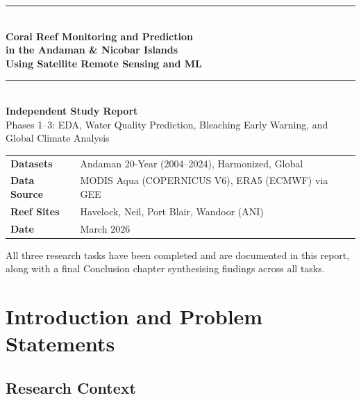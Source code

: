 \documentclass[12pt,a4paper]{report}
\begin{document}
\begin{titlepage}
  \centering
  \vspace*{2cm}
  {\color{darkblue}\rule{\linewidth}{2pt}}\\[0.4cm]
  {\Huge\bfseries\color{darkblue}
    Coral Reef Monitoring and Prediction\\[0.3cm]
    in the Andaman \& Nicobar Islands\\[0.3cm]
    Using Satellite Remote Sensing and ML}\\[0.4cm]
  {\color{darkblue}\rule{\linewidth}{2pt}}\\[1.5cm]

  {\Large\bfseries\color{medblue} Independent Study Report}\\[0.3cm]
  {\large Phases 1--3: EDA, Water Quality Prediction, Bleaching Early Warning, and Global Climate Analysis}\\[2cm]

  \begin{tabular}{ll}
    \textbf{Datasets} & Andaman 20-Year (2004--2024), Harmonized, Global \\[4pt]
    \textbf{Data Source} & MODIS Aqua (COPERNICUS V6), ERA5 (ECMWF) via GEE \\[4pt]
    \textbf{Reef Sites} & Havelock, Neil, Port Blair, Wandoor (ANI) \\[4pt]
    \textbf{Date} & March 2026 \\
  \end{tabular}

  \vfill
  {\footnotesize
    All three research tasks have been completed and are documented in this report,\\
    along with a final Conclusion chapter synthesising findings across all tasks.}
\end{titlepage}

\tableofcontents
\clearpage

\chapter{Introduction and Problem Statements}

\section{Research Context}
\end{document}
